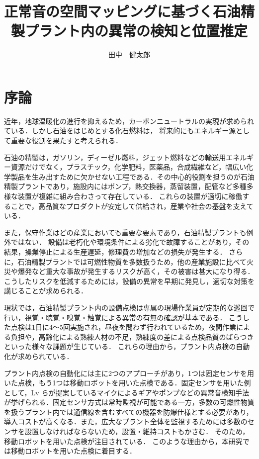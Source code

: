 \documentclass{/workdir/classes/summary}
\title{正常音の空間マッピングに基づく石油精製プラント内の異常の検知と位置推定}
\author{田中　健太郎}
\begin{document}
\maketitle

\thispagestyle{mypagestyle}
\pagestyle{mypagestyle}

\section{序論}

近年，地球温暖化の進行を抑えるため，カーボンニュートラルの実現が求められている．しかし石油をはじめとする化石燃料は，
将来的にもエネルギー源として重要な役割を果たすと考えられる．

石油の精製は，ガソリン，ディーゼル燃料，ジェット燃料などの輸送用エネルギー資源だけでなく，プラスチック，化学肥料，医薬品，合成繊維など，幅広い化学製品を生み出すために欠かせない工程である．その中心的役割を担うのが石油精製プラントであり，施設内にはポンプ，熱交換器，蒸留装置，配管など多種多様な装置が複雑に組み合わさって存在している\cite{Shvindin2008A}．
これらの装置が適切に稼働することで，高品質なプロダクトが安定して供給され，産業や社会の基盤を支えている．

また，保守作業はどの産業においても重要な要素であり，石油精製プラントも例外ではない．
設備は老朽化や環境条件による劣化で故障することがあり，その結果，操業停止による生産遅延，修理費の増加などの損失が発生する．
さらに，石油精製プラントでは可燃性物質を多数扱うため，他の産業施設に比べて火災や爆発など重大な事故が発生するリスクが高く，その被害は甚大になり得る\cite{Tang2021105623}．
こうしたリスクを低減するためには，設備の異常を早期に発見し，適切な対策を講じることが求められる．

現状では，石油精製プラント内の設備点検は専属の現場作業員が定期的な巡回で行い，視覚・聴覚・嗅覚・触覚による異常の有無の確認が基本である．
こうした点検は1日に4～5回実施され，昼夜を問わず行われているため，夜間作業による負担や，高齢化による熟練人材の不足，熟練度の差による点検品質のばらつきといった様々な課題が生じている．
これらの理由から，プラント内点検の自動化が求められている．

プラント内点検の自動化には主に2つのアプローチがあり，1つは固定センサを用いた点検，もう1つは移動ロボットを用いた点検である．固定センサを用いた例として，Lv らが提案しているマイクによるギアやポンプなどの異常音検知手法が挙げられる\cite{Lv2023Overview}．固定センサ方式は常時監視が可能である一方，多数の可燃性物質を扱うプラント内では通信線を含むすべての機器を防爆仕様とする必要があり，導入コストが高くなる．また，広大なプラント全体を監視するためには多数のセンサを設置しなければならないため，設置・維持コストもかさむ．
そのため，移動ロボットを用いた点検が注目されている．
このような理由から，本研究では移動ロボットを用いた点検に着目する．
\end{document}
